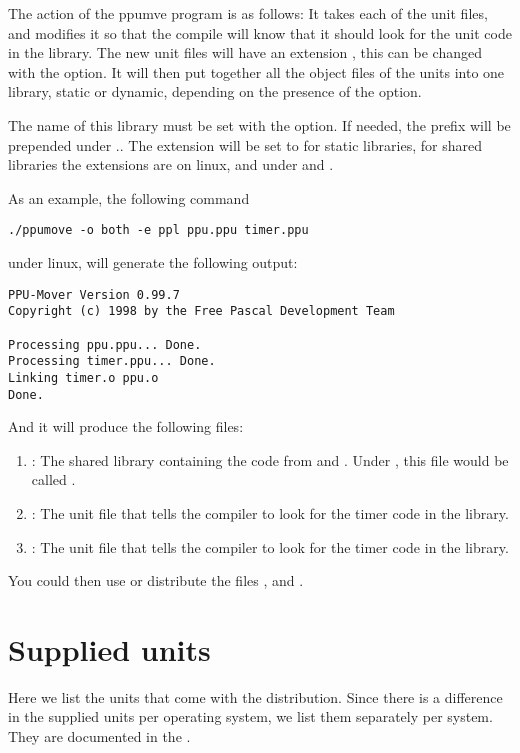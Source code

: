 \documentclass{report}
\begin{document}
The action of the ppumve program is as follows:
It takes each of the unit files, and modifies it so that the compile will
know that it should look for the unit code in the library. The new unit 
files will have an extension , this can be changed with the
 option. It will then put together all the object files of the units
into one library, static or dynamic, depending on the presence of the
 option. 

The name of this library must be set with the  option. 
If needed, the prefix  will be prepended under \linux.. 
The extension will be set to  for static libraries, 
for shared libraries the extensions are  on linux, and  
under \windowsnt and \ostwo.

As an example, the following command
\begin{verbatim}
./ppumove -o both -e ppl ppu.ppu timer.ppu
\end{verbatim}
under linux, will generate the following output:
\begin{verbatim}
PPU-Mover Version 0.99.7
Copyright (c) 1998 by the Free Pascal Development Team

Processing ppu.ppu... Done.
Processing timer.ppu... Done.
Linking timer.o ppu.o
Done.
\end{verbatim}
And it will produce the following files:
\begin{enumerate}
\item {} : The shared library containing the code from 
 and . Under \windowsnt, this file would be called
.
\item {} : The unit file that tells the \fpc compiler to look
for the timer code in the library.
\item {} : The unit file that tells the \fpc compiler to look
for the timer code in the library.
\end{enumerate}
You could then use or distribute the files , 
and .

\section{Supplied units}
Here we list the units that come with the \fpc distribution. Since there is
a difference in the supplied units per operating system, we list them
separately per system. They are documented in the \unitsref.
\end{document}
